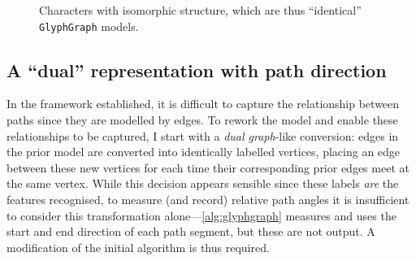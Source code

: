 \documentclass{mpaper}
\begin{document}
\begin{figure}
{
	}
	
	\vspace{0.5em}
	
	\caption{Characters with isomorphic structure, which are thus ``identical'' \texttt{GlyphGraph} models.\label{fig:badisomorphism}}
\end{figure}

\subsection{A ``dual'' representation with path direction} \label{sec:algorithm:dual}
In the framework established, it is difficult to capture the relationship between paths since they are modelled by edges.
To rework the model and enable these relationships to be captured, I start with a \emph{dual graph}-like conversion: edges in the prior model are converted into identically labelled vertices, placing an edge between these new vertices for each time their corresponding prior edges meet at the same vertex.
While this decision appears sensible since these labels \emph{are} the features recognised, to measure (and record) relative path angles it is insufficient to consider this transformation alone---\cref{alg:glyphgraph} measures and uses the start and end direction of each path segment, but these are not output.
A modification of the initial algorithm is thus required.
\end{document}
